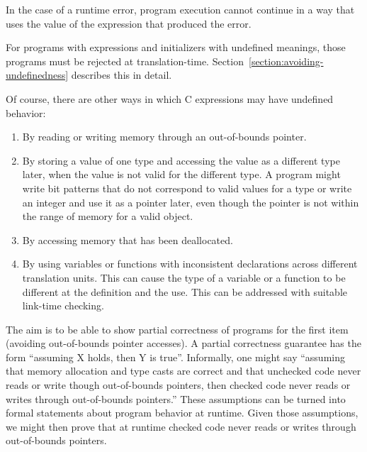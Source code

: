 In the case of a runtime error, program execution cannot continue in a
way that uses the value of the expression that produced the error.

For programs with expressions and initializers with undefined meanings,
those programs must be rejected at translation-time. 
Section~\ref{section:avoiding-undefinedness}
describes this in detail.

Of course, there are other ways in which C expressions may have
undefined behavior:

\begin{enumerate}
\item
  By reading or writing memory through an out-of-bounds pointer.
\item
  By storing a value of one type and accessing the value as a different
  type later, when the value is not valid for the different type. A
  program might write bit patterns that do not correspond to valid
  values for a type or write an integer and use it as a pointer later,
  even though the pointer is not within the range of memory for a valid
  object.
\item
  By accessing memory that has been deallocated.
\item
  By using variables or functions with inconsistent declarations across
  different translation units. This can cause the type of a variable or
  a function to be different at the definition and the use. This can be
  addressed with suitable link-time checking.
\end{enumerate}

The aim is to be able to show partial correctness of programs for the
first item (avoiding out-of-bounds pointer accesses). A
partial correctness guarantee has the form ``assuming X holds, then Y is
true''. Informally, one might say ``assuming that memory allocation and
type casts are correct and that unchecked code never reads or write though
out-of-bounds pointers, then checked code never reads or writes through
out-of-bounds pointers.'' These assumptions can be turned into formal
statements about program behavior at runtime. Given those assumptions,
we might then prove that at runtime checked code never reads or writes
through out-of-bounds pointers.
